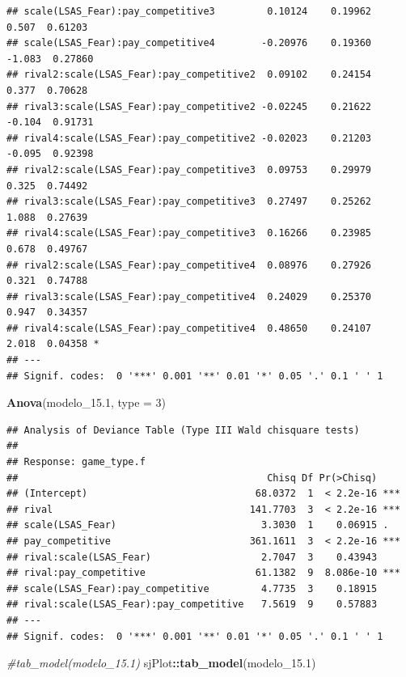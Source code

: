 \documentclass[
]{article}
\newenvironment{Shaded}{\begin{snugshade}}{\end{snugshade}}
\newcommand{\AttributeTok}[1]{\textcolor[rgb]{0.13,0.29,0.53}{#1}}
\newcommand{\CommentTok}[1]{\textcolor[rgb]{0.56,0.35,0.01}{\textit{#1}}}
\newcommand{\DecValTok}[1]{\textcolor[rgb]{0.00,0.00,0.81}{#1}}
\newcommand{\FloatTok}[1]{\textcolor[rgb]{0.00,0.00,0.81}{#1}}
\newcommand{\FunctionTok}[1]{\textcolor[rgb]{0.13,0.29,0.53}{\textbf{#1}}}
\newcommand{\NormalTok}[1]{#1}
\newcommand{\SpecialCharTok}[1]{\textcolor[rgb]{0.81,0.36,0.00}{\textbf{#1}}}
\begin{document}
\begin{verbatim}
## scale(LSAS_Fear):pay_competitive3         0.10124    0.19962   0.507  0.61203    
## scale(LSAS_Fear):pay_competitive4        -0.20976    0.19360  -1.083  0.27860    
## rival2:scale(LSAS_Fear):pay_competitive2  0.09102    0.24154   0.377  0.70628    
## rival3:scale(LSAS_Fear):pay_competitive2 -0.02245    0.21622  -0.104  0.91731    
## rival4:scale(LSAS_Fear):pay_competitive2 -0.02023    0.21203  -0.095  0.92398    
## rival2:scale(LSAS_Fear):pay_competitive3  0.09753    0.29979   0.325  0.74492    
## rival3:scale(LSAS_Fear):pay_competitive3  0.27497    0.25262   1.088  0.27639    
## rival4:scale(LSAS_Fear):pay_competitive3  0.16266    0.23985   0.678  0.49767    
## rival2:scale(LSAS_Fear):pay_competitive4  0.08976    0.27926   0.321  0.74788    
## rival3:scale(LSAS_Fear):pay_competitive4  0.24029    0.25370   0.947  0.34357    
## rival4:scale(LSAS_Fear):pay_competitive4  0.48650    0.24107   2.018  0.04358 *  
## ---
## Signif. codes:  0 '***' 0.001 '**' 0.01 '*' 0.05 '.' 0.1 ' ' 1
\end{verbatim}

\begin{Shaded}
\begin{Highlighting}[]
\FunctionTok{Anova}\NormalTok{(modelo\_15}\FloatTok{.1}\NormalTok{, }\AttributeTok{type =} \DecValTok{3}\NormalTok{)}
\end{Highlighting}
\end{Shaded}

\begin{verbatim}
## Analysis of Deviance Table (Type III Wald chisquare tests)
## 
## Response: game_type.f
##                                           Chisq Df Pr(>Chisq)    
## (Intercept)                             68.0372  1  < 2.2e-16 ***
## rival                                  141.7703  3  < 2.2e-16 ***
## scale(LSAS_Fear)                         3.3030  1    0.06915 .  
## pay_competitive                        361.1611  3  < 2.2e-16 ***
## rival:scale(LSAS_Fear)                   2.7047  3    0.43943    
## rival:pay_competitive                   61.1382  9  8.086e-10 ***
## scale(LSAS_Fear):pay_competitive         4.7735  3    0.18915    
## rival:scale(LSAS_Fear):pay_competitive   7.5619  9    0.57883    
## ---
## Signif. codes:  0 '***' 0.001 '**' 0.01 '*' 0.05 '.' 0.1 ' ' 1
\end{verbatim}

\begin{Shaded}
\begin{Highlighting}[]
\CommentTok{\#tab\_model(modelo\_15.1)}
\NormalTok{sjPlot}\SpecialCharTok{::}\FunctionTok{tab\_model}\NormalTok{(modelo\_15}\FloatTok{.1}\NormalTok{)}
\end{Highlighting}
\end{Shaded}
\end{document}
